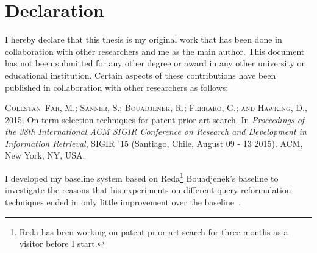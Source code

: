 \chapter*{Declaration}
\vspace{-1em}
I hereby declare that this thesis is my original work that has been done in 
collaboration with other researchers and me as the main author. This document has
not been submitted for any other degree or award in any other university or educational 
institution. 
Certain aspects of these contributions have been published in 
collaboration with other researchers as follows:
\begin{itemize}
\textsc{Golestan~Far, M.; Sanner, S.; Bouadjenek, R.; Ferraro, G.; and Hawking,
  D.}, 2015.
\newblock On term selection techniques for patent prior art search.
\newblock In \emph{Proceedings of the 38th International ACM SIGIR Conference
  on Research and Development in Information Retrieval}, SIGIR '15 (Santiago,
  Chile, August 09 - 13 2015). ACM, New York, NY, USA.
  
\end{itemize}
I developed my baseline system based on Reda\footnote{Reda has been working on patent prior art search for three months as a visitor before I start.} Bouadjenek's baseline 
to investigate the reasons that his experiments on different query reformulation 
techniques ended in only little improvement over the baseline~\citep{Bouadjenek:2015:SQR:2746090.2746092}. 
